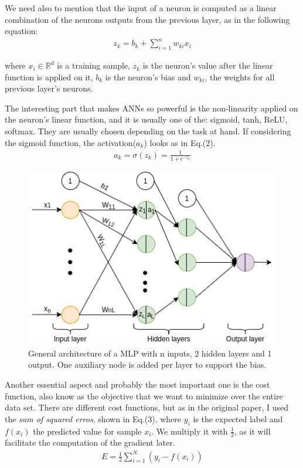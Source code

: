 \documentclass{article}
\begin{document}
We need also to mention that the input of a neuron is computed as a linear combination of the neurons outputs from the previous layer, as in the 
following equation:
\begin{eqnarray}
z_k = b_k + \sum_{i=1}^{n}w_{ki}x_i 
\end{eqnarray}

where $x_i \in \mathbb{R}^d$ is a training sample, $z_k$ is the neuron's value after the linear function is applied on it, $b_k$ is the neuron's bias and $w_{ki}$, the weights for all previous layer's neurons.

The interesting part that makes ANNs so powerful is the non-linearity  applied on the neuron's linear function, and it is usually one of the: sigmoid, tanh, ReLU, softmax. They are usually chosen depending on the task at hand. If considering the sigmoid function, the activation($a_k$) looks as in Eq.(2).
\begin{eqnarray}
	a_k = \sigma(z_k) = \frac{1}{1+e^{-z_k}} 
\end{eqnarray}


\begin{figure}[htbp]
	\centering
	\includegraphics[scale=0.6]{fig/MLP.png}
	\caption{General architecture of a MLP with n inputs, 2 hidden layers and 1 output. One auxiliary node is added per layer to support the bias.}
	\label{fig:mlp_1}
\end{figure}

Another essential aspect and probably the most important one is the cost function, also know as the objective that we want to minimize over the entire data set. There are different cost functions, but as in the original paper\cite{rumelhart}, I used the \textit{sum of squared erros}, shown in Eq.(3), where $y_i$ is the expected label and $f(x_i)$ the predicted value for sample $x_i$. We multiply it with $\frac{1}{2}$, as it will facilitate the computation of the gradient later.
\begin{eqnarray}
	E = \frac{1}{2} \sum_{i=1}^{N}(y_i - f(x_i))
\end{eqnarray}
\end{document}
